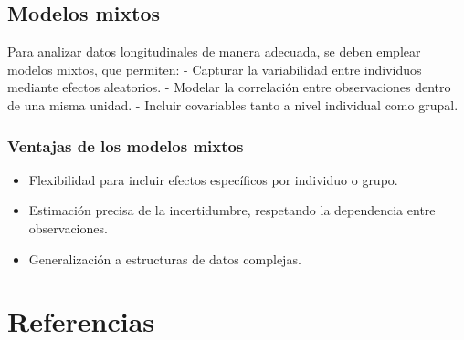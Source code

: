 \documentclass[
  letterpaper,
  DIV=11,
  numbers=noendperiod]{scrreprt}
\providecommand{\tightlist}{%
  \setlength{\itemsep}{0pt}\setlength{\parskip}{0pt}}\usepackage{longtable,booktabs,array}
\newlength{\cslhangindent}
\newenvironment{CSLReferences}[2] %
 {\begin{list}{}{%
  \setlength{\itemindent}{0pt}
  \setlength{\leftmargin}{0pt}
  \setlength{\parsep}{0pt}
  \ifodd #1
   \setlength{\leftmargin}{\cslhangindent}
   \setlength{\itemindent}{-1\cslhangindent}
  \fi
  \setlength{\itemsep}{#2\baselineskip}}}
 {\end{list}}
\begin{document}
\section{Modelos mixtos}\label{modelos-mixtos}

Para analizar datos longitudinales de manera adecuada, se deben emplear
modelos mixtos, que permiten: - Capturar la variabilidad entre
individuos mediante efectos aleatorios. - Modelar la correlación entre
observaciones dentro de una misma unidad. - Incluir covariables tanto a
nivel individual como grupal.

\subsection{Ventajas de los modelos
mixtos}\label{ventajas-de-los-modelos-mixtos}

\begin{itemize}
\tightlist
\item
  Flexibilidad para incluir efectos específicos por individuo o grupo.
\item
  Estimación precisa de la incertidumbre, respetando la dependencia
  entre observaciones.
\item
  Generalización a estructuras de datos complejas.
\end{itemize}


\chapter*{Referencias}\label{referencias}


\label{refs}
\begin{CSLReferences}{0}{1}
\end{CSLReferences}
\end{document}
